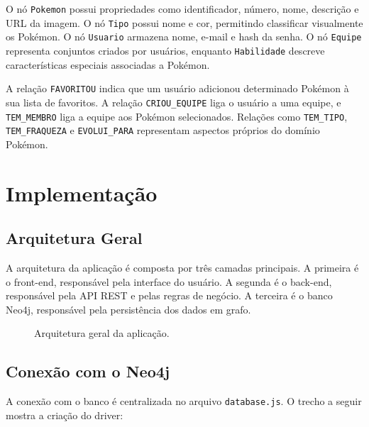 \documentclass[12pt]{article}
\begin{document}
O nó \texttt{Pokemon} possui propriedades como identificador, número, nome, descrição e URL da imagem. O nó \texttt{Tipo} possui nome e cor, permitindo classificar visualmente os Pokémon. O nó \texttt{Usuario} armazena nome, e-mail e hash da senha. O nó \texttt{Equipe} representa conjuntos criados por usuários, enquanto \texttt{Habilidade} descreve características especiais associadas a Pokémon.

A relação \texttt{FAVORITOU} indica que um usuário adicionou determinado Pokémon à sua lista de favoritos. A relação \texttt{CRIOU\_EQUIPE} liga o usuário a uma equipe, e \texttt{TEM\_MEMBRO} liga a equipe aos Pokémon selecionados. Relações como \texttt{TEM\_TIPO}, \texttt{TEM\_FRAQUEZA} e \texttt{EVOLUI\_PARA} representam aspectos próprios do domínio Pokémon.

\section{Implementação}

\subsection{Arquitetura Geral}

A arquitetura da aplicação é composta por três camadas principais. A primeira é o front-end, responsável pela interface do usuário. A segunda é o back-end, responsável pela API REST e pelas regras de negócio. A terceira é o banco Neo4j, responsável pela persistência dos dados em grafo.

\begin{figure}[H]
\centering
{}
\caption{Arquitetura geral da aplicação.}
\label{fig:arquitetura}
\end{figure}

\subsection{Conexão com o Neo4j}

A conexão com o banco é centralizada no arquivo \texttt{database.js}. O trecho a seguir mostra a criação do driver:
\end{document}
